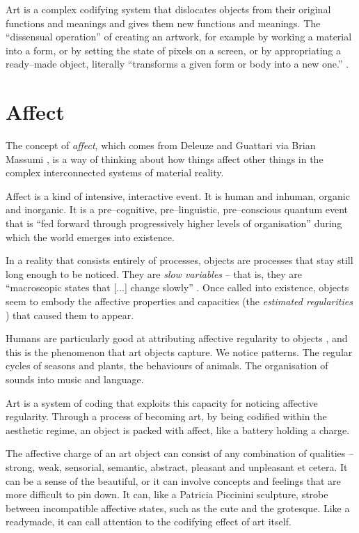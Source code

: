 \documentclass[letter:wpaper]{article}
\begin{document}
    Art is a complex codifying system that dislocates objects from their original functions and meanings and gives them new functions and meanings. The ``dissensual operation'' of creating an artwork, for example by working a material into a form, or by setting the state of pixels on a screen, or by appropriating a ready–made object, literally ``transforms a given form or body into a new one.'' \citep[p.54]{RancierThEmncptdSpcttr2009}.

\section{Affect}

    The concept of \emph{affect}, which comes from Deleuze and Guattari via Brian Massumi \citep{MassumiTheAtnmyOfAffct1995}, is a way of thinking about how things affect other things in the complex interconnected systems of material reality.
    
    Affect is a kind of intensive, interactive event. It is human and inhuman, organic and inorganic. It is a pre–cognitive, pre–linguistic, pre–conscious quantum event that is ``fed forward through progressively higher levels of organisation'' during which the world emerges into existence.
    
    In a reality that consists entirely of processes, objects are processes that stay still long enough to be noticed. They are \emph{slow variables} – that is, they are ``macroscopic states that [...] change slowly'' \citep[p.61]{FlackEtAlTmsclsSymmtryUncrtnty2013}. Once called into existence, objects seem to embody the affective properties and capacities (the \emph{estimated regularities} \citep[p.9]{FlackCrsGrnng2017}) that caused them to appear.

    Humans are particularly good at attributing affective regularity to objects \citep{FristonThFrEnrgPrncpl2010} \citep{DeaconTheSymbolicSpecies1998}, and this is the phenomenon that art objects capture. We notice patterns. The regular cycles of seasons and plants, the behaviours of animals. The organisation of sounds into music and language.
    
    Art is a system of coding that exploits this capacity for noticing affective regularity. Through a process of becoming art, by being codified within the aesthetic regime, an object is packed with affect, like a battery holding a charge.

    The affective charge of an art object can consist of any combination of qualities – strong, weak, sensorial, semantic, abstract, pleasant and unpleasant et cetera. It can be a sense of the beautiful, or it can involve concepts and feelings that are more difficult to pin down. It can, like a Patricia Piccinini sculpture, strobe between incompatible affective states, such as the cute and the grotesque. Like a readymade, it can call attention to the codifying effect of art itself.
\end{document}
